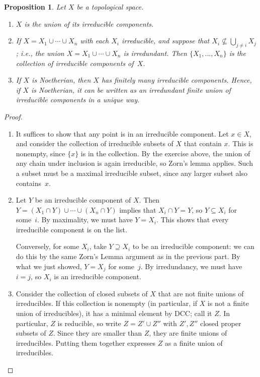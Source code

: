 \documentclass{amsart}[12pt]
\newcommand{\DEF}[1]{\emph{#1}\index{#1}}
\numberwithin{equation}{section}
\theoremstyle{plain} %
\newtheorem{prop}[equation]{Proposition}
\theoremstyle{definition}
\theoremstyle{remark}
\begin{document}
\begin{prop}  Let $X$ be a topological space.
\begin{enumerate}
\item $X$ is the union of its irreducible components. 
\item If $X=X_1\cup \cdots \cup X_n$ with each $X_i$ irreducible, and suppose that $X_i \not\subseteq \bigcup_{j\neq i} X_j$; i.e., the union $X=X_1\cup \cdots \cup  X_n$ is \DEF{irredundant}. Then $\{X_1,\dots,X_n\}$ is the collection of irreducible components of~$X$.
\item If $X$ is Noetherian, then $X$ has finitely many irreducible components. Hence, if $X$ is Noetherian, it can be written as an irredundant finite union of irreducible components in a unique way.
\end{enumerate}
\end{prop}
\begin{proof}
\begin{enumerate}
\item It suffices to show that any point is in an irreducible component. Let $x\in X$, and consider the collection of irreducible subsets of $X$ that contain $x$. This is nonempty, since $\{x\}$ is in the collection.  By the exercise above, the union of any chain under inclusion is again irreducible, so Zorn's lemma applies. Such a subset must be a maximal irreducible subset, since any larger subset also contains~$x$.
\item Let $Y$ be an irreducible component of $X$. Then $Y= (X_1 \cap Y) \cup \cdots \cup  (X_n \cap Y)$ implies that $X_i \cap Y = Y$, so $Y\subseteq X_i$ for some~$i$. By maximality, we must have $Y=X_i$. This shows that every irreducible component is on the list.

Conversely, for some $X_i$, take $Y\supseteq X_i$ to be an irreducible component: we can do this by the same Zorn's Lemma argument as in the previous part. By what we just showed, $Y=X_j$ for some~$j$. By irredundancy, we must have $i=j$, so $X_i$ is an irreducible component.

\item Consider the collection of closed subsets of $X$ that are not finite unions of irreducibles. If this collection is nonempty (in particular, if $X$ is not a finite union of irreducibles), it has a minimal element by DCC; call it $Z$. In particular, $Z$ is reducible, so write $Z=Z'\cup Z''$ with $Z', Z''$ closed proper subsets of $Z$. Since they are smaller than $Z$, they are finite unions of irreducibles. Putting them together expresses $Z$ as a finite union of irreducibles. \qedhere
\end{enumerate}
\end{proof}
\end{document}
